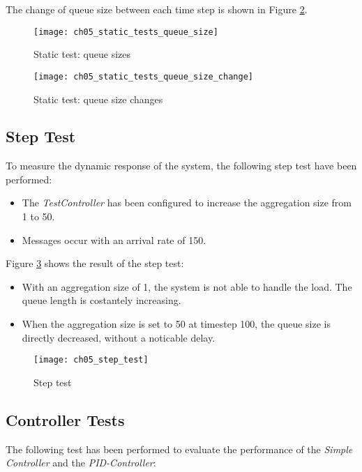 The change of queue size between each time step is shown in Figure \ref{fig:ch5_static_tests_queue_size_change}.

\begin{figure}[htpb]
	\centering
	\texttt{[image: ch05\_static\_tests\_queue\_size]}
	\caption{Static test: queue sizes}
	\label{fig:ch5_static_tests_queue_size}
\end{figure}

\begin{figure}[htpb]
	\centering
	\texttt{[image: ch05\_static\_tests\_queue\_size\_change]}
	\caption{Static test: queue size changes}
	\label{fig:ch5_static_tests_queue_size_change}
\end{figure}

\subsection{Step Test}
To measure the dynamic response of the system, the following step test have been performed:
\begin{itemize}
	\item The \emph{TestController} has been configured to increase the aggregation size from 1 to 50.
	\item Messages occur with an arrival rate of 150.
\end{itemize}

Figure \ref{fig:ch5_step_test} shows the result of the step test:
\begin{itemize}
	\item With an aggregation size of 1, the system is not able to handle the load. The queue length is costantely increasing.
	\item When the aggregation size is set to 50 at timestep 100, the queue size is directly decreased, without a noticable delay.
\end{itemize}

\begin{figure}[htpb]
	\centering
	\texttt{[image: ch05\_step\_test]}
	\caption{Step test}
	\label{fig:ch5_step_test}
\end{figure}

\subsection{Controller Tests}

The following test has been performed to evaluate the performance of the \emph{Simple Controller} and the \emph{PID-Controller}:


